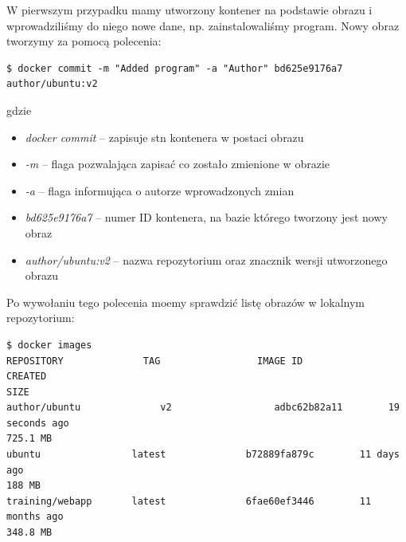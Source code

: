  W pierwszym przypadku mamy utworzony kontener na podstawie obrazu i wprowadziliśmy do niego nowe dane, np. zainstalowaliśmy program. Nowy obraz tworzymy za pomocą polecenia:
\begin{lstlisting}[style=incode]
$ docker commit -m "Added program" -a "Author" bd625e9176a7 author/ubuntu:v2
\end{lstlisting}
gdzie
\begin{itemize}

\item \textit{docker commit} – zapisuje stn kontenera w postaci obrazu
\item \textit{-m} – flaga pozwalająca zapisać co zostało zmienione w obrazie
\item \textit{-a} – flaga informująca o autorze wprowadzonych zmian
\item \textit{bd625e9176a7} –  numer ID kontenera, na bazie którego tworzony jest nowy obraz
\item \textit{author/ubuntu:v2} – nazwa repozytorium oraz znacznik wersji utworzonego obrazu
\end{itemize}
Po wywołaniu tego polecenia moemy sprawdzić listę obrazów w lokalnym repozytorium:
\begin{lstlisting}[style=incode]
$ docker images
REPOSITORY          	TAG                 IMAGE ID            	     CREATED             	
SIZE
author/ubuntu       	   v2                  adbc62b82a11        19 seconds ago      	
725.1 MB
ubuntu         		  latest              b72889fa879c        11 days ago             	
188 MB
training/webapp   	  latest              6fae60ef3446        11 months ago     	  
348.8 MB 
\end{lstlisting}



